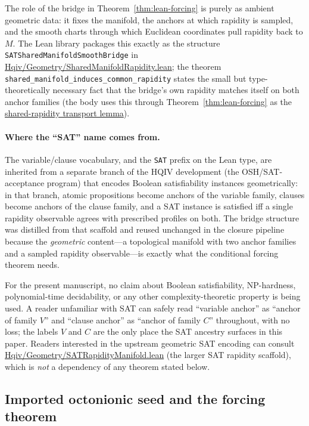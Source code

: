 \documentclass[11pt]{amsart}
\newcommand{\leanrepo}{https://github.com/HQIV/hqiv-lean/blob/main}
\begin{document}
The role of the bridge in Theorem~\ref{thm:lean-forcing} is purely as ambient geometric data: it fixes the manifold, the anchors at which rapidity is sampled, and the smooth charts through which Euclidean coordinates pull rapidity back to \(M\). The Lean library packages this exactly as the structure \texttt{SATSharedManifoldSmoothBridge} in \href{\leanrepo/Hqiv/Geometry/SharedManifoldRapidity.lean}{Hqiv/Geometry/SharedManifoldRapidity.lean}; the theorem \texttt{shared\_manifold\_induces\_common\_rapidity} states the small but type-theoretically necessary fact that the bridge's own rapidity matches itself on both anchor families (the body uses this through Theorem~\ref{thm:lean-forcing} as the \hyperref[lean:rapidity-induces]{shared-rapidity transport lemma}).

\paragraph{Where the ``SAT'' name comes from.}
The variable/clause vocabulary, and the \texttt{SAT} prefix on the Lean type, are inherited from a separate branch of the HQIV development (the OSH/SAT-acceptance program) that encodes Boolean satisfiability instances geometrically: in that branch, atomic propositions become anchors of the variable family, clauses become anchors of the clause family, and a SAT instance is satisfied iff a single rapidity observable agrees with prescribed profiles on both. The bridge structure was distilled from that scaffold and reused unchanged in the closure pipeline because the \emph{geometric} content---a topological manifold with two anchor families and a sampled rapidity observable---is exactly what the conditional forcing theorem needs.

For the present manuscript, no claim about Boolean satisfiability, NP-hardness, polynomial-time decidability, or any other complexity-theoretic property is being used. A reader unfamiliar with SAT can safely read ``variable anchor'' as ``anchor of family \(V\)'' and ``clause anchor'' as ``anchor of family \(C\)'' throughout, with no loss; the labels \(V\) and \(C\) are the only place the SAT ancestry surfaces in this paper. Readers interested in the upstream geometric SAT encoding can consult \href{\leanrepo/Hqiv/Geometry/SATRapidityManifold.lean}{Hqiv/Geometry/SATRapidityManifold.lean} (the larger SAT rapidity scaffold), which is \emph{not} a dependency of any theorem stated below.

\subsection{Imported octonionic seed and the forcing theorem}
\label{subsec:so8-witness-and-forcing}
\end{document}

